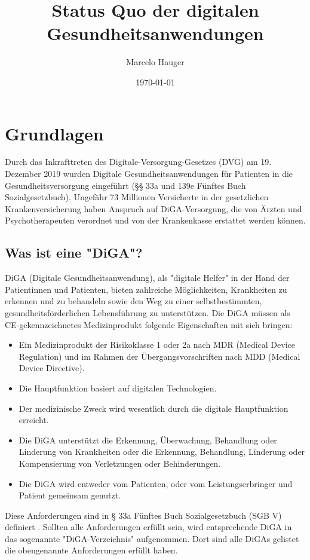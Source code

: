 \documentclass{article}
\title{Status Quo der digitalen Gesundheitsanwendungen}
\author{Marcelo Hauger}
\date{\today}
\begin{document}
	\maketitle
	\newpage
	\tableofcontents
	\newpage
	\listoffigures
	\newpage
	\section{Grundlagen}
		Durch das Inkrafttreten des Digitale-Versorgung-Gesetzes (DVG) am 19. Dezember 2019 wurden Digitale Gesundheitsanwendungen für Patienten in die Gesundheitsversorgung eingeführt (§§ 33a und 139e Fünftes Buch Sozialgesetzbuch). Ungefähr 73 Millionen Versicherte in der gesetzlichen Krankenversicherung haben Anspruch auf DiGA-Versorgung, die von Ärzten und Psychotherapeuten verordnet und von der Krankenkasse erstattet werden können.
		\subsection{Was ist eine "DiGA"?}
			DiGA (Digitale Gesundheitsanwendung), als "digitale Helfer" in der Hand der Patientinnen und Patienten, bieten zahlreiche Möglichkeiten, Krankheiten zu erkennen und zu behandeln sowie den Weg zu einer selbstbestimmten, gesundheitsförderlichen Lebensführung zu unterstützen. Die DiGA müssen als CE-gekennzeichnetes Medizinprodukt folgende Eigenschaften mit sich bringen:
			\begin{itemize}
				\item Ein Medizinprodukt der Risikoklasse 1 oder 2a nach MDR (Medical Device Regulation) und im Rahmen der Übergangsvorschriften nach MDD (Medical Device Directive).
				\item Die Hauptfunktion basiert auf digitalen Technologien.
				\item Der medizinische Zweck wird wesentlich durch die digitale Hauptfunktion erreicht.
				\item Die DiGA unterstützt die Erkennung, Überwachung, Behandlung oder Linderung von Krankheiten oder die Erkennung, Behandlung, Linderung oder Kompensierung von Verletzungen oder Behinderungen.
				\item Die DiGA wird entweder vom Patienten, oder vom Leistungserbringer und Patient gemeinsam genutzt.
			\end{itemize}  
			Diese Anforderungen sind in § 33a Fünftes Buch Sozialgesetzbuch (SGB V) definiert \cite[vgl. Was ist eine DiGA?]{wissenswertes-diga}. Sollten alle Anforderungen erfüllt sein, wird entsprechende DiGA in das sogenannte "DiGA-Verzeichnis" aufgenommen. Dort sind alle DiGAs gelistet die obengenannte Anforderungen erfüllt haben.   
		\newpage
\end{document}
